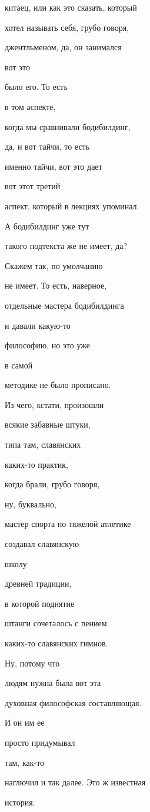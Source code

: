 китаец, или как это сказать, который

хотел называть себя, грубо говоря,

джентльменом, да, он занимался

вот это

было его. То есть

в том аспекте,

когда мы сравнивали бодибилдинг,

да, и вот тайчи, то есть

именно тайчи, вот это дает

вот этот третий

аспект, который в лекциях упоминал.

А бодибилдинг уже тут

такого подтекста же не имеет, да?

Скажем так, по умолчанию

не имеет. То есть, наверное,

отдельные мастера бодибилдинга

и давали какую-то

философию, но это уже

в самой

методике не было прописано.

Из чего, кстати, произошли

всякие забавные штуки,

типа там, славянских

каких-то практик,

когда брали, грубо говоря,

ну, буквально,

мастер спорта по тяжелой атлетике

создавал славянскую

школу

древней традиции,

в которой поднятие

штанги сочеталось с пением

каких-то славянских гимнов.

Ну, потому что

людям нужна была вот эта

духовная философская составляющая.

И он им ее

просто придумывал

там, как-то

наглючил и так далее. Это ж известная

история.

